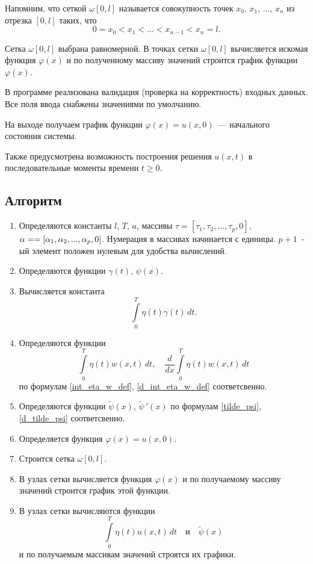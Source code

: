 \documentclass{article}
\renewcommand{\ge}{\geqslant}
\theoremstyle{definition}
\begin{document}
Напомним, что сеткой $\omega[0,l]$ называется совокупность точек $x_0$, $x_1$, ..., $x_n$ из отрезка $[0,l]$ таких, что
\begin{equation*}
	0 = x_0 < x_1 < ... < x_{n - 1} < x_n = l.
\end{equation*}

Сетка $\omega[0,l]$ выбрана равномерной. В точках сетки $\omega[0,l]$ вычисляется искомая функция $\varphi(x)$ и 
по полученному массиву значений строится график функции $\varphi(x)$.

В программе реализована валидация (проверка на корректность) входных данных. Все поля ввода снабжены значениями по умолчанию.

На выходе получаем график функции $\varphi(x) = u(x,0)$~--- начального состояния системы.

Также предусмотрена возможность построения решения $u(x,t)$ в последовательные моменты времени $t \ge 0$.

\subsection{Алгоритм}
\begin{enumerate}
	\item Определяются константы $l$, $T$, $a$, массивы $\tau = [\tau_1, \tau_2, ..., \tau_p, 0]$, 
	$\alpha = \linebreak = [\alpha_1, \alpha_2, ..., \alpha_p, 0]$. Нумерация в массивах начинается с единицы. $p + 1$~-ый элемент 
	положен нулевым для удобства вычислений. 
	\item Определяются функции $\gamma(t)$, $\psi(x)$.
	\item Вычисляется константа
	\begin{equation*}
		\int\limits_0^T \eta(t)\gamma(t) \,dt.
	\end{equation*}
	\item Определяются функции 
	\begin{equation*}
		\int\limits_0^T \eta(t)w(x,t) \,dt, \quad \dfrac{d}{dx}\int\limits_0^T \eta(t)w(x,t) \,dt
	\end{equation*}
	по формулам \eqref{int_eta_w_def}, \eqref{d_int_eta_w_def} соответсвенно.
	\item Определяются функции $\widetilde{\psi}(x)$, $\widetilde{\psi}\,'(x)$ 
	по формулам \eqref{tilde_psi}, \eqref{d_tilde_psi} соответсвенно.
	\item Определяется функция $\varphi(x) = u(x,0)$. 
	\item Строится сетка $\omega[0,l]$. 
	\item В узлах сетки вычисляется функция $\varphi(x)$ и по получаемому массиву значений 
	строится график этой функции.
	\item В узлах сетки вычисляются функции 
	\begin{equation*}
		\int\limits_0^T \eta(t)u(x,t) \,dt \quad\text{и}\quad \widetilde{\psi}(x)
	\end{equation*} 
	и по получаемым массивам значений строятся их графики.
\end{enumerate}
\end{document}
